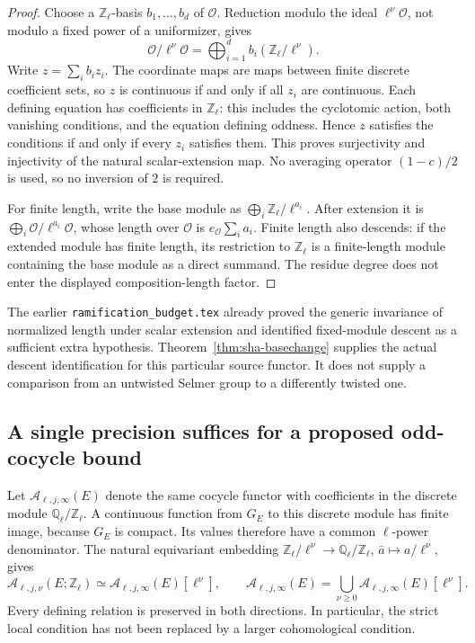 \begin{proof}
Choose a \(\mathbb Z_\ell\)-basis \(b_1,\ldots,b_d\) of \(\mathcal O\).
Reduction modulo the ideal \(\ell^\nu\mathcal O\), not modulo a fixed
power of a uniformizer, gives
\[
 \mathcal O/\ell^\nu\mathcal O
   =\bigoplus_{i=1}^d b_i(\mathbb Z_\ell/\ell^\nu).
\]
Write \(z=\sum_i b_i z_i\). The coordinate maps are maps between finite
discrete coefficient sets, so \(z\) is continuous if and only if all
\(z_i\) are continuous. Each defining equation has coefficients in
\(\mathbb Z_\ell\): this includes the cyclotomic action, both vanishing
conditions, and the equation defining oddness. Hence \(z\) satisfies
the conditions if and only if every \(z_i\) satisfies them. This proves
surjectivity and injectivity of the natural scalar-extension map.
No averaging operator \((1-c)/2\) is used, so no inversion of \(2\)
is required.

For finite length, write the base module as
\(\bigoplus_i\mathbb Z_\ell/\ell^{a_i}\).
After extension it is
\(\bigoplus_i\mathcal O/\ell^{a_i}\mathcal O\), whose length over
\(\mathcal O\) is \(e_{\mathcal O}\sum_i a_i\).
Finite length also descends: if the extended module has finite
length, its restriction to \(\mathbb Z_\ell\) is a finite-length module
containing the base module as a direct summand. The residue degree
does not enter the displayed composition-length factor.
\end{proof}

The earlier \texttt{ramification\_budget.tex} already proved the
generic invariance of normalized length under scalar extension and
identified fixed-module descent as a sufficient extra hypothesis.
Theorem~\ref{thm:sha-basechange} supplies the actual descent
identification for this particular source functor. It does not
supply a comparison from an untwisted Selmer group to a differently
twisted one.

\subsection{A single precision suffices for a proposed odd-cocycle bound}

Let \(\mathcal A_{\ell,j,\infty}(E)\) denote the same cocycle functor
with coefficients in the discrete module
\(\mathbb Q_\ell/\mathbb Z_\ell\).
A continuous function from \(G_E\) to this discrete module has finite
image, because \(G_E\) is compact. Its values therefore have a common
\(\ell\)-power denominator. The natural equivariant embedding
\(\mathbb Z_\ell/\ell^\nu\to\mathbb Q_\ell/\mathbb Z_\ell\),
\(\bar a\mapsto a/\ell^\nu\), gives
\[
 \mathcal A_{\ell,j,\nu}(E;\mathbb Z_\ell)
 \simeq \mathcal A_{\ell,j,\infty}(E)[\ell^\nu],
 \qquad
 \mathcal A_{\ell,j,\infty}(E)
   =\bigcup_{\nu\geq0}\mathcal A_{\ell,j,\infty}(E)[\ell^\nu].
\]
Every defining relation is preserved in both directions. In particular,
the strict local condition has not been replaced by a larger
cohomological condition.

